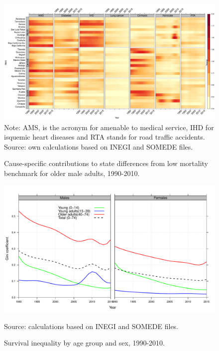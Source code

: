 \documentclass[11.5pt]{article}
\begin{document}
\begin{spacing}{1.5}
\begin{figure}[h!]
\centering
\caption{Cause-specific contributions to state differences from low mortality benchmark for older male adults, 1990-2010.}
\label{fig:e40_74_males}
\includegraphics[scale=.31]{Adult_Male_heatmap.pdf}
Note: AMS, is the acronym for amenable to medical service, IHD for isquemic heart diseases and RTA stands for road traffic accidents. Source: own calculations based on INEGI and SOMEDE files. 
\end{figure}


\begin{figure}[h!]
\centering
\caption{Survival inequality by age group and sex, 1990-2010.}
\label{fig:Gini}
\includegraphics[scale=.5]{Gini_fig.pdf}

 Source: calculations based on INEGI and SOMEDE files.
\end{figure}


\end{spacing}

%
\end{document}

